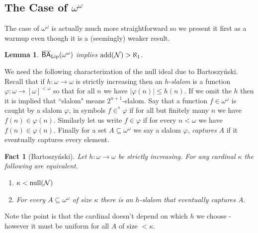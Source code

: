 \documentclass[leqno,11pt]{amsart}
\newtheorem{lemma}[theorem]{Lemma}
\newtheorem{fact}[theorem]{Fact}
\theoremstyle{definition}
\theoremstyle{remark}
\def\Null{\mathcal N}
\def\BA{\mathsf{BA}}
\def\baire{\omega^\omega}
\def\add{{\rm add}}
\begin{document}
\subsection{The Case of $\baire$}
The case of $\baire$ is actually much more straightforward so we present it first as a warmup even though it is a (seemingly) weaker result. 
\begin{lemma}
    $\overline{\BA}_{\rm Lip}(\baire)$ implies $\add(\Null) > \aleph_1$. \label{add}
\end{lemma}
We need the following characterization of the null ideal due to Bartoszy\'nski. Recall that if $h:\omega \to \omega$ is strictly increasing then an $h$-{\em slalom} is a function $\varphi:\omega \to [\omega]^{<\omega}$ so that for all $n$ we have $|\varphi(n)| \leq h(n)$. If we omit the $h$ then it is implied that ``slalom" means $2^{n+1}$-slalom. Say that a function $f\in \omega^\omega$ is caught by a slalom $\varphi$, in symbols $f \in^* \varphi$ if for all but finitely many $n$ we have $f(n) \in \varphi(n)$. Similarly let us write $f \in \varphi$ if for every $n < \omega$ we have $f(n) \in \varphi(n)$. Finally for a set $A \subseteq \baire$ we say a slalom $\varphi$, {\em captures} $A$ if it eventually captures every element. 

\begin{fact}[Bartoszy\'nski]\label{slalomfact}
    Let $h:\omega \to \omega$ be strictly increasing. For any cardinal $\kappa$ the following are equivalent.\begin{enumerate}
        \item $\kappa < {\rm null}(\mathcal N)$
         \item For every $A \subseteq \baire$ of size $\kappa$ there is an $h$-slalom that eventually captures $A$. 
    \end{enumerate}
\end{fact}

Note the point is that the cardinal doesn't depend on which $h$ we choose - however it must be uniform for all $A$ of size ${<}\kappa$. 
\end{document}
